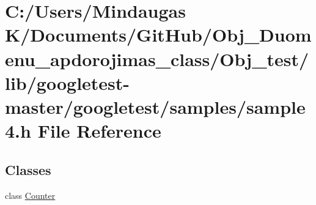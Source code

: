 \hypertarget{_obj__test_2lib_2googletest-master_2googletest_2samples_2sample4_8h}{}\section{C\+:/\+Users/\+Mindaugas K/\+Documents/\+Git\+Hub/\+Obj\+\_\+\+Duomenu\+\_\+apdorojimas\+\_\+class/\+Obj\+\_\+test/lib/googletest-\/master/googletest/samples/sample4.h File Reference}
\label{_obj__test_2lib_2googletest-master_2googletest_2samples_2sample4_8h}
\subsection*{Classes}
\begin{DoxyCompactItemize}
\item 
class \mbox{\hyperlink{class_counter}{Counter}}
\end{DoxyCompactItemize}
